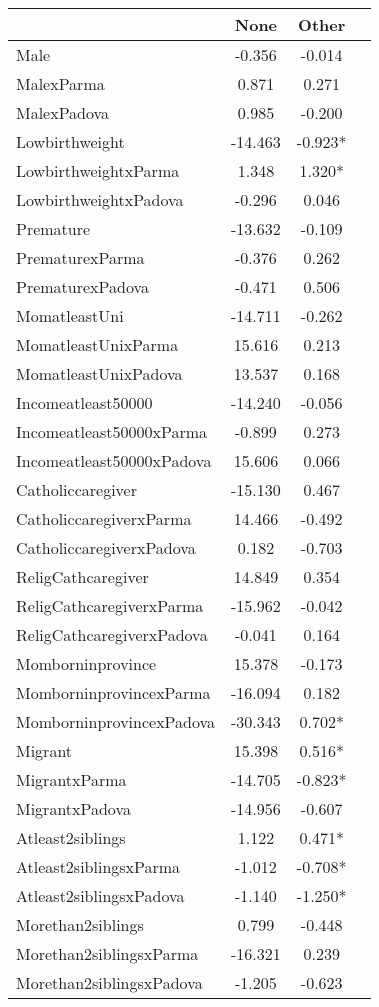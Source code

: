\begin{tabular}{l c c c}
\toprule
& None & Other \\
\midrule
Male &    -0.356 &    -0.014 \\
MalexParma &     0.871 &     0.271 \\
MalexPadova &     0.985 &    -0.200 \\
Lowbirthweight &   -14.463 & -0.923* \\
LowbirthweightxParma &     1.348 & 1.320* \\
LowbirthweightxPadova &    -0.296 &     0.046 \\
Premature &   -13.632 &    -0.109 \\
PrematurexParma &    -0.376 &     0.262 \\
PrematurexPadova &    -0.471 &     0.506 \\
MomatleastUni &   -14.711 &    -0.262 \\
MomatleastUnixParma &    15.616 &     0.213 \\
MomatleastUnixPadova &    13.537 &     0.168 \\
Incomeatleast50000 &   -14.240 &    -0.056 \\
Incomeatleast50000xParma &    -0.899 &     0.273 \\
Incomeatleast50000xPadova &    15.606 &     0.066 \\
Catholiccaregiver &   -15.130 &     0.467 \\
CatholiccaregiverxParma &    14.466 &    -0.492 \\
CatholiccaregiverxPadova &     0.182 &    -0.703 \\
ReligCathcaregiver &    14.849 &     0.354 \\
ReligCathcaregiverxParma &   -15.962 &    -0.042 \\
ReligCathcaregiverxPadova &    -0.041 &     0.164 \\
Momborninprovince &    15.378 &    -0.173 \\
MomborninprovincexParma &   -16.094 &     0.182 \\
MomborninprovincexPadova &   -30.343 & 0.702* \\
Migrant &    15.398 & 0.516* \\
MigrantxParma &   -14.705 & -0.823* \\
MigrantxPadova &   -14.956 &    -0.607 \\
Atleast2siblings &     1.122 & 0.471* \\
Atleast2siblingsxParma &    -1.012 & -0.708* \\
Atleast2siblingsxPadova &    -1.140 & -1.250* \\
Morethan2siblings &     0.799 &    -0.448 \\
Morethan2siblingsxParma &   -16.321 &     0.239 \\
Morethan2siblingsxPadova &    -1.205 &    -0.623 \\
\bottomrule
\end{tabular}
